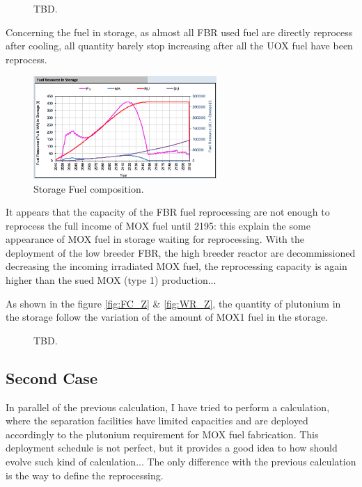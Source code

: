 \documentclass[12pt]{article}
\begin{document}
\begin{figure}[h!]
\centering
{}
\caption{TBD.\label{fig:cool_reprocc} }
\end{figure}


Concerning the fuel in storage, as almost all FBR
used fuel are directly reprocess after cooling,
all quantity barely stop increasing after all the
UOX fuel have been reprocess.

\begin{figure}[h!]
\centering
\includegraphics[width=0.62\textwidth]{img/FuelInStorage_1}
\caption{Storage Fuel composition.}
\label{fig:storagecompo_1}
\end{figure}

It appears that the capacity of the FBR fuel
reprocessing are not enough to reprocess the full
income of MOX fuel until 2195: this explain the
some appearance of MOX fuel in storage waiting for
reprocessing. With the deployment of the low
breeder FBR, the high breeder reactor are
decommissioned decreasing the incoming irradiated
MOX fuel,  the reprocessing capacity is again
higher than the sued MOX (type 1) production...


As shown in the figure \ref{fig:FC_Z} \&
\ref{fig:WR_Z}, the quantity of plutonium in the
storage follow the variation of the amount of MOX1
fuel in the storage.

\begin{figure}[h!]
\centering
{}
\caption{TBD.\label{fig:FC_WR_zoom} }
\end{figure}

\subsection{Second Case}
In parallel of the previous calculation, I have
tried to perform a calculation, where the
separation facilities have limited capacities and
are deployed accordingly to the plutonium
requirement for MOX fuel fabrication. This
deployment schedule is not perfect, but it
provides a good idea to how should evolve such
kind of calculation...
The only difference with the previous calculation
is the way to define the reprocessing.
\end{document}

